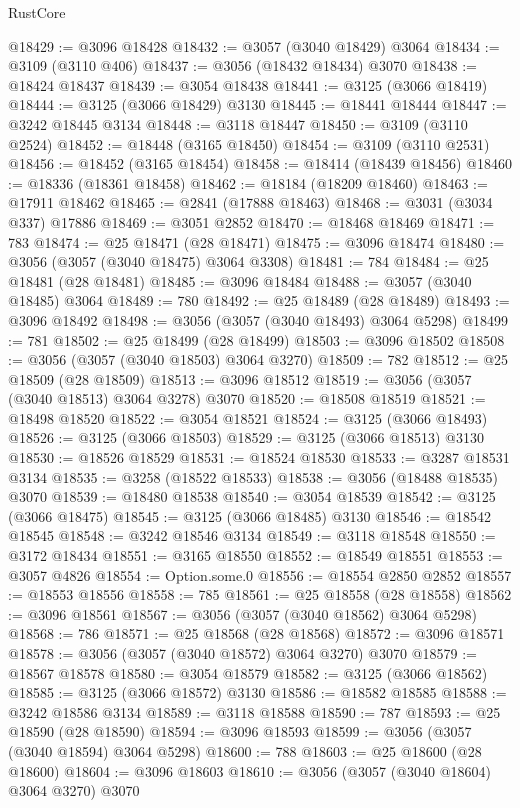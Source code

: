 \begin{lexlean}{RustCore}
\begin{coremodule}
@18429 := @3096 @18428
@18432 := @3057 (@3040 @18429) @3064
@18434 := @3109 (@3110 @406)
@18437 := @3056 (@18432 @18434) @3070
@18438 := @18424 @18437
@18439 := @3054 @18438
@18441 := @3125 (@3066 @18419)
@18444 := @3125 (@3066 @18429) @3130
@18445 := @18441 @18444
@18447 := @3242 @18445 @3134
@18448 := @3118 @18447
@18450 := @3109 (@3110 @2524)
@18452 := @18448 (@3165 @18450)
@18454 := @3109 (@3110 @2531)
@18456 := @18452 (@3165 @18454)
@18458 := @18414 (@18439 @18456)
@18460 := @18336 (@18361 @18458)
@18462 := @18184 (@18209 @18460)
@18463 := @17911 @18462
@18465 := @2841 (@17888 @18463)
@18468 := @3031 (@3034 @337) @17886
@18469 := @3051 @2852
@18470 := @18468 @18469
@18471 := 783
@18474 := @25 @18471 (@28 @18471)
@18475 := @3096 @18474
@18480 := @3056 (@3057 (@3040 @18475) @3064 @3308)
@18481 := 784
@18484 := @25 @18481 (@28 @18481)
@18485 := @3096 @18484
@18488 := @3057 (@3040 @18485) @3064
@18489 := 780
@18492 := @25 @18489 (@28 @18489)
@18493 := @3096 @18492
@18498 := @3056 (@3057 (@3040 @18493) @3064 @5298)
@18499 := 781
@18502 := @25 @18499 (@28 @18499)
@18503 := @3096 @18502
@18508 := @3056 (@3057 (@3040 @18503) @3064 @3270)
@18509 := 782
@18512 := @25 @18509 (@28 @18509)
@18513 := @3096 @18512
@18519 := @3056 (@3057 (@3040 @18513) @3064 @3278) @3070
@18520 := @18508 @18519
@18521 := @18498 @18520
@18522 := @3054 @18521
@18524 := @3125 (@3066 @18493)
@18526 := @3125 (@3066 @18503)
@18529 := @3125 (@3066 @18513) @3130
@18530 := @18526 @18529
@18531 := @18524 @18530
@18533 := @3287 @18531 @3134
@18535 := @3258 (@18522 @18533)
@18538 := @3056 (@18488 @18535) @3070
@18539 := @18480 @18538
@18540 := @3054 @18539
@18542 := @3125 (@3066 @18475)
@18545 := @3125 (@3066 @18485) @3130
@18546 := @18542 @18545
@18548 := @3242 @18546 @3134
@18549 := @3118 @18548
@18550 := @3172 @18434
@18551 := @3165 @18550
@18552 := @18549 @18551
@18553 := @3057 @4826
@18554 := Option.some.{0}
@18556 := @18554 @2850 @2852
@18557 := @18553 @18556
@18558 := 785
@18561 := @25 @18558 (@28 @18558)
@18562 := @3096 @18561
@18567 := @3056 (@3057 (@3040 @18562) @3064 @5298)
@18568 := 786
@18571 := @25 @18568 (@28 @18568)
@18572 := @3096 @18571
@18578 := @3056 (@3057 (@3040 @18572) @3064 @3270) @3070
@18579 := @18567 @18578
@18580 := @3054 @18579
@18582 := @3125 (@3066 @18562)
@18585 := @3125 (@3066 @18572) @3130
@18586 := @18582 @18585
@18588 := @3242 @18586 @3134
@18589 := @3118 @18588
@18590 := 787
@18593 := @25 @18590 (@28 @18590)
@18594 := @3096 @18593
@18599 := @3056 (@3057 (@3040 @18594) @3064 @5298)
@18600 := 788
@18603 := @25 @18600 (@28 @18600)
@18604 := @3096 @18603
@18610 := @3056 (@3057 (@3040 @18604) @3064 @3270) @3070

\end{coremodule}
\end{lexlean}

